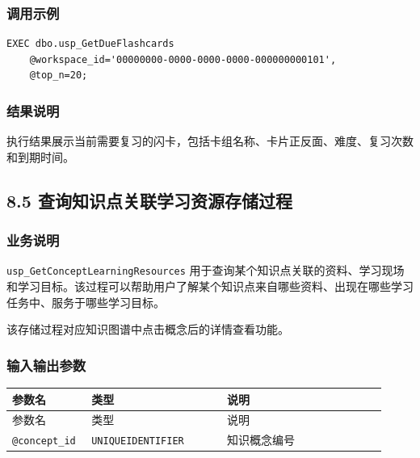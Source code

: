 \documentclass[10pt,a4paper,fontset=none]{ctexart}
\begin{document}
\subsubsection*{调用示例}

\begin{Verbatim}[fontsize=\scriptsize,frame=single]
EXEC dbo.usp_GetDueFlashcards
    @workspace_id='00000000-0000-0000-0000-000000000101',
    @top_n=20;
\end{Verbatim}

\subsubsection*{结果说明}

执行结果展示当前需要复习的闪卡，包括卡组名称、卡片正反面、难度、复习次数和到期时间。\par

\subsection*{8.5 查询知识点关联学习资源存储过程}

\subsubsection*{业务说明}

\texttt{usp\_GetConceptLearningResources} 用于查询某个知识点关联的资料、学习现场和学习目标。该过程可以帮助用户了解某个知识点来自哪些资料、出现在哪些学习任务中、服务于哪些学习目标。\par

该存储过程对应知识图谱中点击概念后的详情查看功能。\par

\subsubsection*{输入输出参数}

\begingroup\scriptsize
\renewcommand{\arraystretch}{1.18}
\setlength{\LTleft}{0pt}
\setlength{\LTright}{0pt}
\begin{longtable}{>{\raggedright\arraybackslash}p{0.18\linewidth}>{\raggedright\arraybackslash}p{0.34\linewidth}>{\raggedright\arraybackslash}p{0.40\linewidth}}
\toprule
参数名 & 类型 & 说明 \\
\midrule
\endfirsthead
\toprule
参数名 & 类型 & 说明 \\
\midrule
\endhead
\texttt{@concept\_id} & \texttt{UNIQUEIDENTIFIER} & 知识概念编号 \\
\bottomrule
\end{longtable}
\endgroup
\end{document}

